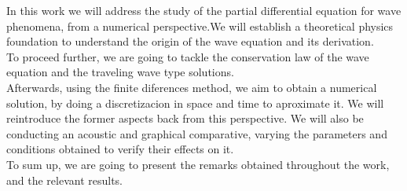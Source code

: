 

\begin{abstracts}

In this work we will address the study of the partial differential equation for wave phenomena, from a numerical perspective.We will establish a theoretical physics foundation to understand the origin of the wave equation and its derivation.\\


To proceed further, we are going to tackle the conservation law of the wave equation and the traveling wave type solutions.\\

Afterwards, using the finite diferences method, we aim to obtain a numerical solution, by doing a discretizacion in space and time to aproximate it. We will reintroduce the former aspects back from this perspective. We will also be conducting an acoustic and graphical comparative, varying the parameters and conditions obtained to verify their effects on it.\\


To sum up, we are going to present the remarks obtained throughout the work, and the relevant results.


\end{abstracts}
